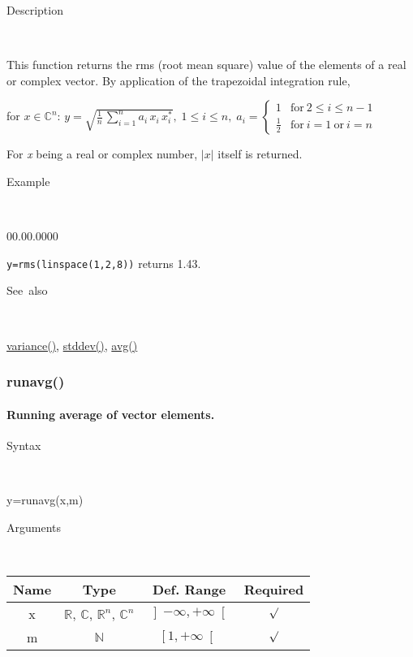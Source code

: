 \begin{description}
\item [Description]~
\end{description}
This function returns the rms (root mean square) value of the elements
of a real or complex vector. By application of the trapezoidal integration
rule,

\medskip{}
for $x\in$$\mathbb{C}^{n}$: $y=\sqrt{{\displaystyle \frac{1}{n}}\,\sum\limits _{i=1}^{n}a_{i}\, x_{i}\, x_{i}^{*}}$$,\;1\leq i\leq n,\; a_{i}=\left\{ \begin{array}{cc}
1 & \mathrm{for}\:2\leq i\leq n-1\\
\frac{1}{2} & \mathrm{for}\: i=1\:\mathrm{or}\: i=n\end{array}\right.$
\medskip{}

For \textit{x} being a real or complex number, \textit{$\left|x\right|$}
itself is returned.

\begin{description}
\item [Example]~
\end{description}
\begin{lyxlist}{00.00.0000}
\item [\texttt{y=rms(linspace(1,2,8))}]returns 1.43.
\end{lyxlist}
\begin{description}
\item [See~also]~
\end{description}
\textcolor{blue}{\hyperlink{variance}{variance()}}\textcolor{black}{,}
\textcolor{blue}{\hyperlink{stddev}{stddev()}}\textcolor{black}{,}
\textcolor{blue}{\hyperlink{avg}{avg()}}


\newpage
\subsubsection*{\hypertarget{runavg}{}{\Large runavg()}}


\paragraph{\label{par:Running-average}Running average of vector elements.}

\begin{description}
\item [Syntax]~
\end{description}
y=runavg(x,m)

\begin{description}
\item [Arguments]~
\end{description}
\begin{tabular}{|c|c|c|c|}
\hline 
Name&
Type&
Def. Range&
Required\tabularnewline
\hline
\hline 
x&
$\mathbb{R}$, $\mathbb{C}$, $\mathbb{R}^{n}$, $\mathbb{C}^{n}$&
$\left]-\infty,+\infty\right[$&
$\surd$\tabularnewline
\hline
m&
$\mathbb{N}$&
$\left[1,+\infty\right[$&
$\surd$\tabularnewline
\hline
\end{tabular}

